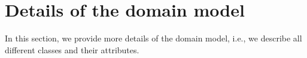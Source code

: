 \section{Details of the domain model}
\label{sec:appendix domain model}

In this section, we provide more details of the domain model, i.e., we describe all different classes and their attributes.
